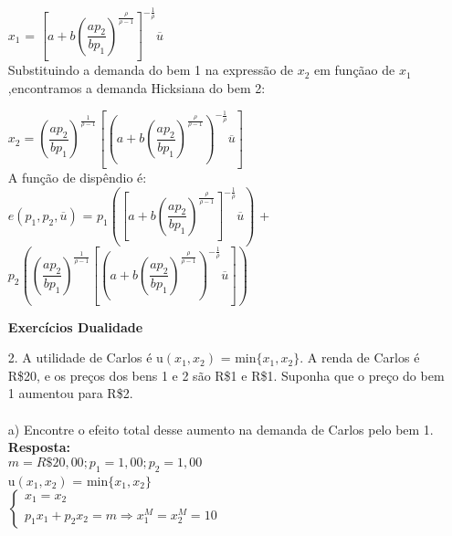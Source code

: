 \begin{enumerate}
{$x_{1}$} = {$\left[a + b\left(\dfrac{ap_{2}}{bp_{1}}\right)^{\frac{\rho}{\rho-1}} \right]^{-\frac{1}{\rho}}\overline{u}$}\\

Substituindo a demanda do bem 1 na expressão de {$x_2$} em funçãao de {$x_1$},encontramos a demanda Hicksiana do bem 2: 


{$x_{2} =  \left(\dfrac{ap_{2}}{bp_{1}}\right)^{\frac{1}{\rho-1}}\left[\left(a + b\left(\dfrac{ap_{2}}{bp_{1}}\right)^{\frac{\rho}{\rho-1}} \right)^{-\frac{1}{\rho}}\overline{u}\right]$}\\

A função de dispêndio é:\\
{$e(p_1, p_2, \overline{u})$} = {$p_{1}\left(\left[a + b\left(\dfrac{ap_{2}}{bp_{1}}\right)^{\frac{\rho}{\rho-1}} \right]^{-\frac{1}{\rho}}\overline{u}\right)$} + {$p_{2}\left(\left(\dfrac{ap_{2}}{bp_{1}}\right)^{\frac{1}{\rho-1}}\left[\left(a + b\left(\dfrac{ap_{2}}{bp_{1}}\right)^{\frac{\rho}{\rho-1}} \right)^{-\frac{1}{\rho}}\overline{u}\right]\right)$}\\


\newpage

\begin{center}
\textbf{Exercícios Dualidade}\\
\end{center}


\item[2.] A utilidade de Carlos é u{$(x_{1}, x_{2})$} = min{$\{x_{1}, x_{2}\}$}. A renda de Carlos é R\$20, e os preços dos bens 1 e 2 são R\$1 e R\$1. Suponha que o preço do bem 1 aumentou para R\$2.



\paragraph{} a) Encontre o efeito total desse aumento na demanda de Carlos pelo bem 1.\\

\textbf{Resposta:}\\

{$m = R\$ 20,00; p_{1} = 1,00; p_{2} = 1,00$}\\

u{$(x_{1}, x_{2})$} = min{$\{x_{1}, x_{2}\}$}\\

{$\begin{cases} x_{1} = x_{2}\\
p_{1}x_{1}+p_{2}x_{2} = m \Rightarrow
x_{1}^{M} = x_{2}^{M} = 10
\end{cases}$} 


\end{enumerate}
